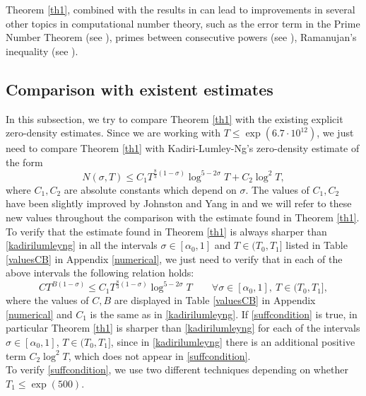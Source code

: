 \documentclass[reqno]{amsart}
\numberwithin{equation}{section}
\theoremstyle{remark}
\begin{document}
Theorem \ref{th1}, combined with the results in \cite{bellotti2023explicit} can lead to improvements in several other topics in computational number theory, such as the error term in the Prime Number Theorem (see \cite{yangdj, fiori_sharper_2023}), primes between consecutive powers (see \cite{CULLYHUGILL2023100,michaela2024error}), Ramanujan's inequality (see \cite{platt_error_2020, michaelavonmangoldt}).
\subsection{Comparison with existent estimates}
In this subsection, we try to compare Theorem \ref{th1} with the existing explicit zero-density estimates. Since we are working with $T\le \exp(6.7\cdot 10^{12})$, we just need to compare Theorem \ref{th1} with Kadiri-Lumley-Ng's zero-density estimate \cite{KADIRI201822} of the form
\begin{equation}\label{kadirilumleyng}
 N(\sigma,T)\le C_1T^{\frac{8}{3}(1-\sigma)}\log^{5-2\sigma}T+C_2\log^2T,   
\end{equation}
where $C_1, C_2$ are absolute constants which depend on $\sigma$. The values of $C_1,C_2$ have been slightly improved by Johnston and Yang in \cite{yangdj} and we will refer to these new values throughout the comparison with the estimate found in Theorem \ref{th1}.\\
To verify that the estimate found in Theorem \ref{th1} is always sharper than \eqref{kadirilumleyng} in all the intervals $\sigma\in[\alpha_0,1]$ and $T\in(T_0,T_1]$ listed in Table \ref{valuesCB} in Appendix \ref{numerical}, we just need to verify that in each of the above intervals the following relation holds:
\begin{equation}\label{suffcondition}
   CT^{B(1-\sigma)}\le C_1T^{\frac{8}{3}(1-\sigma)}\log^{5-2\sigma}T\qquad \forall \sigma\in[\alpha_0,1],\  T\in(T_0,T_1], 
\end{equation}
where the values of $C,B$ are displayed in Table \ref{valuesCB} in Appendix \ref{numerical} and $C_1$ is the same as in \eqref{kadirilumleyng}. If \eqref{suffcondition} is true, in particular Theorem \ref{th1} is sharper than \eqref{kadirilumleyng} for each of the intervals $\sigma\in[\alpha_0,1]$, $T\in(T_0,T_1]$, since in \eqref{kadirilumleyng} there is an additional positive term $C_2\log^2 T$, which does not appear in \eqref{suffcondition}.\\
To verify \eqref{suffcondition}, we use two different techniques depending on whether $T_1\le \exp(500)$.\\
\end{document}
